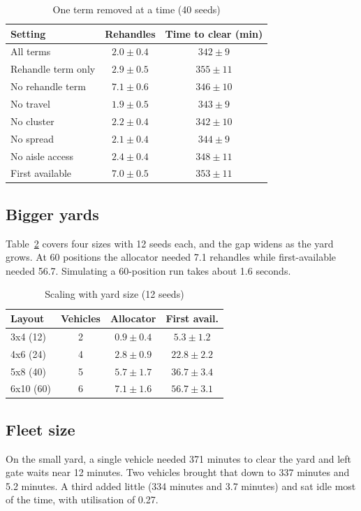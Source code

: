 \documentclass[conference]{IEEEtran}
\begin{document}
\begin{table}[t]
\caption{One term removed at a time (40 seeds)}
\label{tab:abl}
\centering
\small
\begin{tabular}{lcc}
\toprule
Setting & Rehandles & Time to clear (min) \\
\midrule
All terms & $2.0\pm0.4$ & $342\pm9$ \\
Rehandle term only & $2.9\pm0.5$ & $355\pm11$ \\
No rehandle term & $7.1\pm0.6$ & $346\pm10$ \\
No travel & $1.9\pm0.5$ & $343\pm9$ \\
No cluster & $2.2\pm0.4$ & $342\pm10$ \\
No spread & $2.1\pm0.4$ & $344\pm9$ \\
No aisle access & $2.4\pm0.4$ & $348\pm11$ \\
First available & $7.0\pm0.5$ & $353\pm11$ \\
\bottomrule
\end{tabular}
\end{table}

\subsection{Bigger yards}
Table~\ref{tab:scale} covers four sizes with 12 seeds each, and the gap widens as the yard grows. At 60 positions the allocator needed 7.1 rehandles while first-available needed 56.7. Simulating a 60-position run takes about 1.6 seconds.

\begin{table}[t]
\caption{Scaling with yard size (12 seeds)}
\label{tab:scale}
\centering
\small
\begin{tabular}{lccc}
\toprule
Layout & Vehicles & Allocator & First avail. \\
\midrule
3x4 (12) & 2 & $0.9\pm0.4$ & $5.3\pm1.2$ \\
4x6 (24) & 4 & $2.8\pm0.9$ & $22.8\pm2.2$ \\
5x8 (40) & 5 & $5.7\pm1.7$ & $36.7\pm3.4$ \\
6x10 (60) & 6 & $7.1\pm1.6$ & $56.7\pm3.1$ \\
\bottomrule
\end{tabular}
\end{table}

\subsection{Fleet size}
On the small yard, a single vehicle needed 371 minutes to clear the yard and left gate waits near 12 minutes. Two vehicles brought that down to 337 minutes and 5.2 minutes. A third added little (334 minutes and 3.7 minutes) and sat idle most of the time, with utilisation of 0.27.
\end{document}
